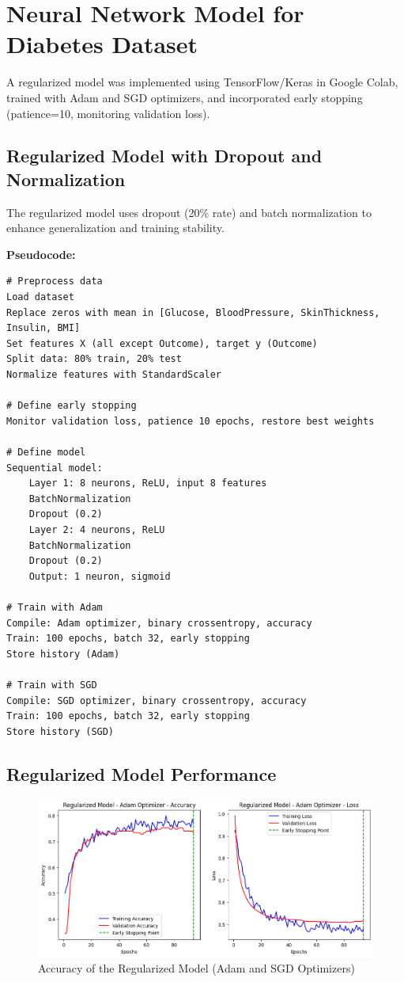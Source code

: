 \documentclass[a4paper,12pt]{article}
\begin{document}
\clearpage %

\section*{Neural Network Model for Diabetes Dataset}
A regularized model was implemented using TensorFlow/Keras in Google Colab, trained with Adam and SGD optimizers, and incorporated early stopping (patience=10, monitoring validation loss).

\subsection*{Regularized Model with Dropout and Normalization}
The regularized model uses dropout (20\% rate) and batch normalization to enhance generalization and training stability.

\textbf{Pseudocode:}
\begin{lstlisting}
# Preprocess data
Load dataset
Replace zeros with mean in [Glucose, BloodPressure, SkinThickness, Insulin, BMI]
Set features X (all except Outcome), target y (Outcome)
Split data: 80% train, 20% test
Normalize features with StandardScaler

# Define early stopping
Monitor validation loss, patience 10 epochs, restore best weights

# Define model
Sequential model:
    Layer 1: 8 neurons, ReLU, input 8 features
    BatchNormalization
    Dropout (0.2)
    Layer 2: 4 neurons, ReLU
    BatchNormalization
    Dropout (0.2)
    Output: 1 neuron, sigmoid

# Train with Adam
Compile: Adam optimizer, binary crossentropy, accuracy
Train: 100 epochs, batch 32, early stopping
Store history (Adam)

# Train with SGD
Compile: SGD optimizer, binary crossentropy, accuracy
Train: 100 epochs, batch 32, early stopping
Store history (SGD)
\end{lstlisting}

\subsection*{Regularized Model Performance}
\begin{figure}[H]
    \centering
    \includegraphics[width=1.0\textwidth]{assets/diabetes/adam_diabetes_loss.png}
    \caption{Accuracy of the Regularized Model (Adam and SGD Optimizers)}
\end{figure}
\end{document}
